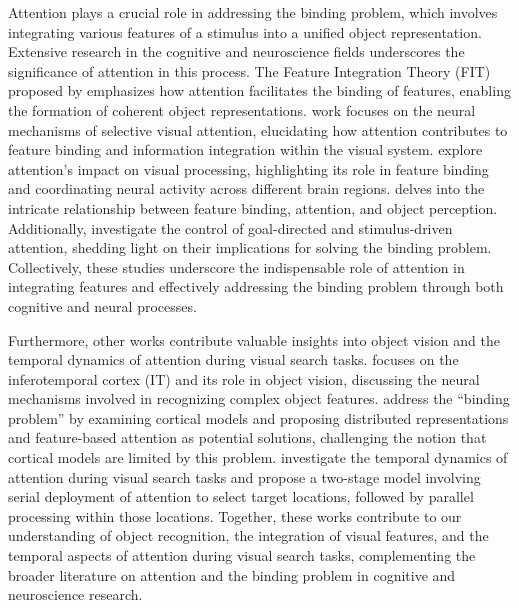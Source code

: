 Attention plays a crucial role in addressing the binding problem, which involves integrating various features of a stimulus into a unified object representation. Extensive research in the cognitive and neuroscience fields underscores the significance of attention in this process. The Feature Integration Theory (FIT) proposed by \citet{treisman1980feature} emphasizes how attention facilitates the binding of features, enabling the formation of coherent object representations. \citet{desimone1995neural} work focuses on the neural mechanisms of selective visual attention, elucidating how attention contributes to feature binding and information integration within the visual system. \citet{reynolds2004attentional} explore attention's impact on visual processing, highlighting its role in feature binding and coordinating neural activity across different brain regions. \citet{treisman1998feature} delves into the intricate relationship between feature binding, attention, and object perception. Additionally, \citet{corbetta2002control} investigate the control of goal-directed and stimulus-driven attention, shedding light on their implications for solving the binding problem. Collectively, these studies underscore the indispensable role of attention in integrating features and effectively addressing the binding problem through both cognitive and neural processes.

Furthermore, other works contribute valuable insights into object vision and the temporal dynamics of attention during visual search tasks. \citet{tanaka1996inferotemporal} focuses on the inferotemporal cortex (IT) and its role in object vision, discussing the neural mechanisms involved in recognizing complex object features. \citet{riesenhuber1999cortical} address the ``binding problem'' by examining cortical models and proposing distributed representations and feature-based attention as potential solutions, challenging the notion that cortical models are limited by this problem. \citet{woodman2003serial} investigate the temporal dynamics of attention during visual search tasks and propose a two-stage model involving serial deployment of attention to select target locations, followed by parallel processing within those locations. Together, these works contribute to our understanding of object recognition, the integration of visual features, and the temporal aspects of attention during visual search tasks, complementing the broader literature on attention and the binding problem in cognitive and neuroscience research.

